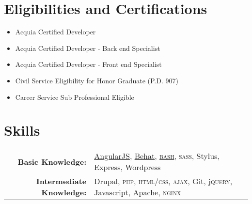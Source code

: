 \documentclass[a4paper,10pt]{article}
\begin{document}
\section{Eligibilities and Certifications}

\begin{itemize}
  \scshape
  \item Acquia Certified Developer
  \item Acquia Certified Developer - Back end Specialist
  \item Acquia Certified Developer - Front end Specialist
  \item Civil Service Eligibility for Honor Graduate (P.D. 907)
  \item Career Service Sub Professional Eligible
\end{itemize}

\section{Skills}

\begin{tabular}{>{\bfseries}rl}
  Basic Knowledge: & \href{http://angularjs.org/}{AngularJS}, \href{http://behat.org/}{Behat}, \textsc{\href{https://www.gnu.org/software/bash/}{bash}}, \textsc{sass}, Stylus, Express, Wordpress\\
  Intermediate Knowledge: & Drupal, \textsc{php}, \textsc{html/css}, \textsc{ajax}, Git, j\textsc{query}, Javascript, Apache, \textsc{ng\textnormal{i}nx}
\end{tabular}
\end{document}

